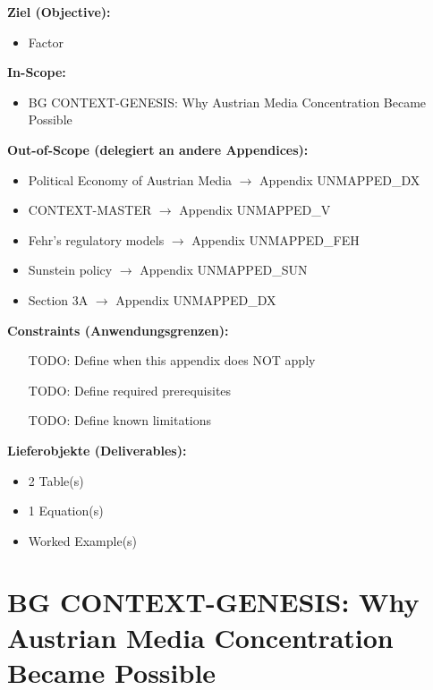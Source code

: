 \begin{tcolorbox}[
    colback=orange!5!white,
    colframe=orange!75!black,
    title={\textbf{Appendix Scope: Ziel / In-Scope / Out-of-Scope / Constraints}},
    fonttitle=\bfseries
]

\textbf{Ziel (Objective):}
\begin{itemize}[nosep]
    \item Factor
\end{itemize}

\textbf{In-Scope:}
\begin{itemize}[nosep]
    \item BG CONTEXT-GENESIS: Why Austrian Media Concentration Became Possible
\end{itemize}

\textbf{Out-of-Scope (delegiert an andere Appendices):}
\begin{itemize}[nosep]
    \item Political Economy of Austrian Media $\rightarrow$ Appendix UNMAPPED_DX
    \item CONTEXT-MASTER $\rightarrow$ Appendix UNMAPPED_V
    \item Fehr's regulatory models $\rightarrow$ Appendix UNMAPPED_FEH
    \item Sunstein policy $\rightarrow$ Appendix UNMAPPED_SUN
    \item Section 3A $\rightarrow$ Appendix UNMAPPED_DX
\end{itemize}

\textbf{Constraints (Anwendungsgrenzen):}
\begin{itemize}[nosep]
    \item [TODO: Define when this appendix does NOT apply]
    \item [TODO: Define required prerequisites]
    \item [TODO: Define known limitations]
\end{itemize}

\textbf{Lieferobjekte (Deliverables):}
\begin{itemize}[nosep]
    \item 2 Table(s)
    \item 1 Equation(s)
    \item Worked Example(s)
\end{itemize}

\end{tcolorbox}


\section{BG CONTEXT-GENESIS: Why Austrian Media Concentration Became Possible}
\label{app:bg-context-genesis}

